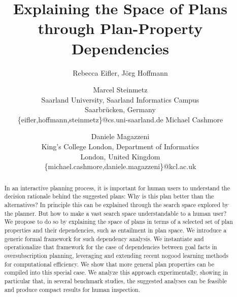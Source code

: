 \documentclass[letterpaper]{article}
\begin{document}
\nocopyright

\title{Explaining the Space of Plans through Plan-Property Dependencies}

\author{
\hspace{1.0cm}Rebecca Eifler, J\"org Hoffmann \and Marcel Steinmetz\\
  \hspace{1.0cm}Saarland University, Saarland Informatics Campus\\
  \hspace{1.0cm}Saarbr\"ucken, Germany\\
  \hspace{1.0cm}\{eifler,hoffmann,steinmetz\}@cs.uni-saarland.de
\And
\hspace{4.0cm}Michael Cashmore \and Daniele Magazzeni\\
\hspace{4.0cm}King's College London, Department of Informatics\\
\hspace{4.0cm}London, United Kingdom\\
\hspace{4.0cm}\{michael.cashmore,daniele.magazzeni\}@kcl.ac.uk 
}

\maketitle

\begin{abstract}
In an interactive planning process, it is important for human users to
	understand the decision rationale behind the suggested plans:
	Why is this plan better than the alternatives?  In principle
	this can be explained through the search space explored by the
	planner.  But how to make a vast search space understandable
	to a human user?  We propose to do so by explaining the space
	of plans in terms of a selected set of plan properties and
	their dependencies, such as entailment in plan space.  We
	introduce a generic formal framework for such dependency
	analysis.  We instantiate and operationalize that framework
	for the case of dependencies between goal facts in
	oversubscription planning, leveraging and extending recent
	nogood learning methods for computational efficiency. We show
	that more general plan properties can be compiled into this
	special case. We analyze this approach experimentally, showing
	in particular that, in several benchmark studies, the
	suggested analyses can be feasible and produce compact results
	for human inspection.
\end{abstract}











\FloatBarrier


\medskip

\noindent

%
%
\end{document}
